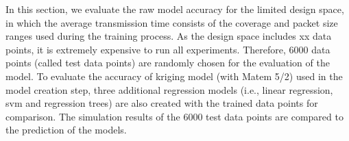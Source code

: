 







In this section, we evaluate the \gls{raw} model accuracy for the limited design space, in which the average transmission time consists of the coverage and packet size ranges used during the training process. As the design space includes xx data points, it is extremely expensive to run all experiments. Therefore, 6000 data points (called test data points) are randomly chosen for the evaluation of the model. To evaluate the accuracy of kriging model (with Matem 5/2) used in the model creation step, three additional regression models (i.e., linear regression, \gls{svm} and regression trees) are also created with the trained data points for comparison. The simulation results of the 6000 test data points are compared to the prediction of the models. 


